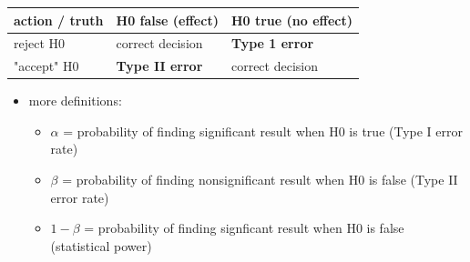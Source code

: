 \documentclass[11pt]{article}
\begin{document}
\begin{center}
\begin{tabular}{lll}
action / truth & H0 false (effect) & H0 true (no effect)\\
\hline
reject H0 & correct decision & \textbf{Type 1 error}\\
"accept" H0 & \textbf{Type II error} & correct decision\\
\end{tabular}
\end{center}

\begin{itemize}
\item more definitions:
\begin{itemize}
\item $\alpha$ = probability of finding significant result when H0 is true (Type I error rate)
\item $\beta$ = probability of finding nonsignificant result when H0 is false (Type II error rate)
\item $1-\beta$ = probability of finding signficant result when H0 is false (statistical power)
\end{itemize}
\end{itemize}
\end{document}
